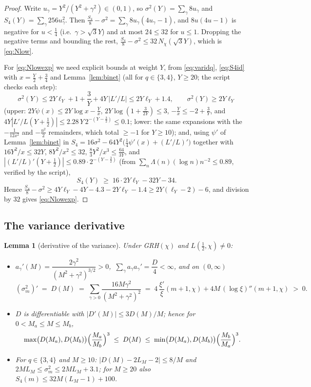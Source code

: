 \documentclass[11pt]{article}
\newtheorem{lemma}{Lemma}
\begin{document}
\begin{proof}
Write $u_\gamma=Y^2/(Y^2+\gamma^2)\in(0,1)$, so
$\sigma^2(Y)=\sum_\gamma8u_\gamma$ and
$S_4(Y)=\sum_\gamma256u_\gamma^2$. Then
$\tfrac{S_4}8-\sigma^2=\sum_\gamma8u_\gamma(4u_\gamma-1)$, and
$8u(4u-1)$ is negative for $u<\tfrac14$ (i.e.\ $\gamma>\sqrt3Y$) and
at most $24\le32$ for $u\le1$. Dropping the negative terms and
bounding the rest,
$\tfrac{S_4}8-\sigma^2\le32\,N_\chi(\sqrt3Y)$, which is
\eqref{eq:Nlow}.

For \eqref{eq:Nlowexp} we need explicit bounds at weight $Y$, from
\eqref{eq:varidq}, \eqref{eq:S4id} with $x=\tfrac Y2+\tfrac34$ and
Lemma~\ref{lem:binet} (all for $q\in\{3,4\}$, $Y\ge20$; the script
checks each step):
\[
\sigma^2(Y)\le2Y\ell_Y+1+\frac3Y+4Y\,|L'/L|\le2Y\ell_Y+1.4,
\qquad
\sigma^2(Y)\ge2Y\ell_Y
\]
(upper: $2Y\psi(x)\le2Y\log x-\tfrac Yx$,
$2Y\log(1+\tfrac3{2Y})\le3$, $-\tfrac Yx\le-2+\tfrac3Y$, and
$4Y|L'/L(Y+\tfrac12)|\le2.28\,Y\,2^{-(Y-\frac32)}\le0.1$;
lower: the same expansions with the $-\tfrac1{12x^2}$ and
$-\tfrac{u^2}2$ remainders, which total $\ge-1$ for $Y\ge10$); and,
using $\psi'$ of Lemma~\ref{lem:binet} in
$S_4=16\sigma^2-64Y^2\bigl(\tfrac14\psi'(x)+(L'/L)'\bigr)$ together
with $16Y^2/x\le32Y$, $8Y^2/x^2\le32$,
$\tfrac{8}{3}Y^2/x^3\le\tfrac{64}{3Y}$, and
$|(L'/L)'(Y+\tfrac12)|\le0.89\cdot2^{-(Y-\frac32)}$
(from $\sum_n\Lambda(n)(\log n)n^{-2}\le0.89$, verified by the
script),
\[
S_4(Y)\;\ge\;16\cdot2Y\ell_Y-32Y-34 .
\]
Hence
$\tfrac{S_4}8-\sigma^2\ge4Y\ell_Y-4Y-4.3-2Y\ell_Y-1.4
\ge2Y(\ell_Y-2)-6$, and division by $32$ gives
\eqref{eq:Nlowexp}.
\end{proof}

\subsection*{The variance derivative}

\begin{lemma}[derivative of the variance]\label{lem:Dprop}
Under GRH$(\chi)$ and $L(\tfrac12,\chi)\ne0$:
\begin{itemize}
\item[(i)] $a_\gamma'(M)=\dfrac{2\gamma^2}{(M^2+\gamma^2)^{3/2}}>0$,
$\ \sum_\gamma a_\gamma a_\gamma'=\dfrac D4<\infty$, and on $(0,\infty)$
\[
(\sigma_m^2)'\;=\;D(M)\;=\;\sum_{\gamma>0}
\frac{16M\gamma^2}{(M^2+\gamma^2)^2}
\;=\;4\,\frac{\xi'}{\xi}(m+1,\chi)+4M\,(\log\xi)''(m+1,\chi)\;>\;0 .
\]
\item[(ii)] $D$ is differentiable with $|D'(M)|\le3D(M)/M$; hence for
$0<M_a\le M\le M_b$,
\[
\max\bigl(D(M_a),D(M_b)\bigr)\Bigl(\frac{M_a}{M_b}\Bigr)^{3}
\;\le\;D(M)\;\le\;
\min\bigl(D(M_a),D(M_b)\bigr)\Bigl(\frac{M_b}{M_a}\Bigr)^{3}.
\]
\item[(iii)] For $q\in\{3,4\}$ and $M\ge10$:
$\bigl|D(M)-2L_M-2\bigr|\le8/M$ and $2ML_M\le\sigma_m^2\le2ML_M+3.1$;
for $M\ge20$ also $S_4(m)\le32M(L_M-1)+100$.
\end{itemize}
\end{lemma}
\end{document}
